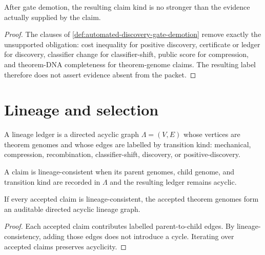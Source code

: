 \begin{theorem}
\label{thm:automated-discovery-demotion-soundness}
After gate demotion, the resulting claim kind is no stronger than the evidence
actually supplied by the claim.
\end{theorem}
\begin{proof}
The clauses of \autoref{def:automated-discovery-gate-demotion} remove exactly
the unsupported obligation: cost inequality for positive discovery,
certificate or ledger for discovery, classifier change for classifier-shift,
public score for compression, and theorem-DNA completeness for theorem-genome
claims. The resulting label therefore does not assert evidence absent from the
packet.
\end{proof}

\section{Lineage and selection}
\label{sec:automated-discovery-lineage-selection}

\begin{definition}
\label{def:automated-discovery-lineage-ledger}
A lineage ledger is a directed acyclic graph $\Lambda=(V,E)$ whose vertices
are theorem genomes and whose edges are labelled by transition kind:
mechanical, compression, recombination, classifier-shift, discovery, or
positive-discovery.
\end{definition}

\begin{definition}
\label{def:automated-discovery-lineage-consistent-claim}
A claim is lineage-consistent when its parent genomes, child genome, and
transition kind are recorded in $\Lambda$ and the resulting ledger remains
acyclic.
\end{definition}

\begin{theorem}
\label{thm:automated-discovery-lineage-dag}
If every accepted claim is lineage-consistent, the accepted theorem genomes
form an auditable directed acyclic lineage graph.
\end{theorem}
\begin{proof}
Each accepted claim contributes labelled parent-to-child edges. By
lineage-consistency, adding those edges does not introduce a cycle. Iterating
over accepted claims preserves acyclicity.
\end{proof}

